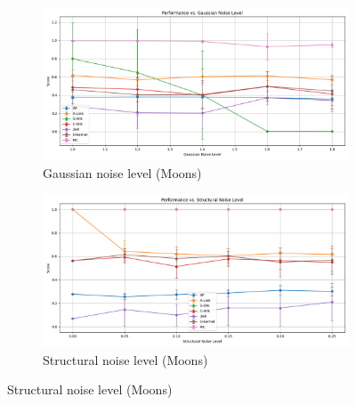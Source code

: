 \documentclass[
	10pt,
	parskip=half-,	
	paper=a4,
	english
	]{scrartcl}
\begin{document}
\begin{figure}[h!]
    \begin{subfigure}[b]{0.45\textwidth}
        \includegraphics[width=\textwidth]{../data/plots/results_gaussian_noise_moons.png}
        \caption{Gaussian noise level (Moons)}
    \end{subfigure}
    \begin{subfigure}[b]{0.45\textwidth}
        \includegraphics[width=\textwidth]{../data/plots/results_structural_noise_moons.png}
        \caption{Structural noise level (Moons)}
    \end{subfigure}
    
    \vspace{0.3cm}
    

\end{figure}
\end{document}
